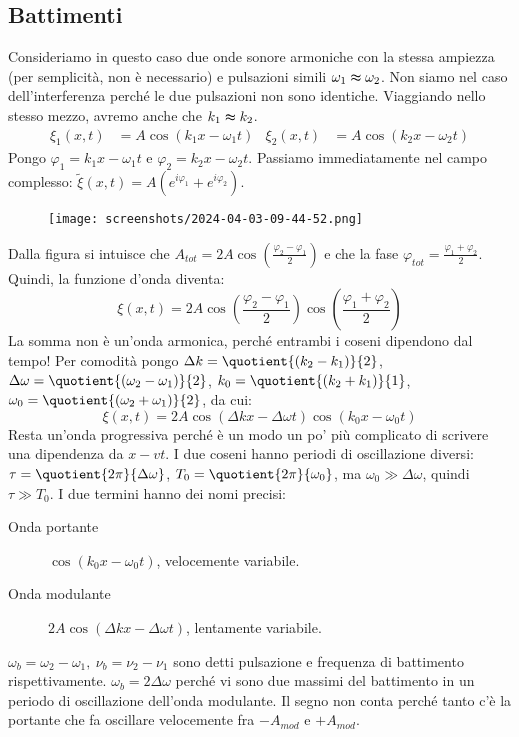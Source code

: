 \subsection{Battimenti}
Consideriamo in questo caso due onde sonore armoniche con la stessa ampiezza (per semplicità, non è necessario) e pulsazioni simili \(\omega _1 \thickapprox  \omega _2\). Non siamo nel caso dell'interferenza perché le due pulsazioni non sono identiche. Viaggiando nello stesso mezzo, avremo anche che \(k_1 \thickapprox  k_2\).
\begin{align}
	\xi _1 (x,t) &= A \cos (k_1x - \omega _1 t) & \xi _2 (x,t) &= A \cos (k_2x - \omega _2 t)
\end{align}
Pongo \(\varphi _1 = k_1 x - \omega_1 t\) e \(\varphi _2 = k_2 x - \omega _2 t\). Passiamo immediatamente nel campo complesso: \(\widetilde{\xi } (x,t) = A (e^{i \varphi _1} + e^{i \varphi _2}) \).
\begin{figure}[H]
	\centering
	\texttt{[image: screenshots/2024-04-03-09-44-52.png]}
\end{figure}
Dalla figura si intuisce che \(A_{tot} = 2A \cos \left( \frac{\varphi _2 - \varphi _1}{2} \right) \) e che la fase \(\varphi _{tot} = \frac{\varphi _1 + \varphi _2}{2} \). Quindi, la funzione d'onda diventa:
\[
	\xi (x,t) = 2A \cos \left( \frac{\varphi _2 - \varphi _1}{2} \right) \cos \left( \frac{\varphi _1 + \varphi _2}{2} \right) 
\]
La somma non è un'onda armonica, perché entrambi i coseni dipendono dal tempo! Per comodità pongo \(\Delta k = \quotient{(k_2 - k_1)}{2} \), \(\Delta \omega = \quotient{(\omega _2 - \omega _1)}{2} \), \(k_0 = \quotient{(k_2 + k_1)}{1} \), \(\omega _0 = \quotient{(\omega _2 + \omega _1 )}{2} \), da cui:
\[
	\xi (x,t) = 2A \cos (\Delta k x - \Delta \omega t) \cos (k_0 x - \omega _0 t)
\]
Resta un'onda progressiva perché è un modo un po' più complicato di scrivere una dipendenza da \(x-vt\). I due coseni hanno periodi di oscillazione diversi: \(\tau = \quotient{2\pi}{\Delta \omega } \), \(T_0 = \quotient{2 \pi }{\omega _0} \), ma \(\omega _0 \gg \Delta \omega \), quindi \(\tau \gg T_0\).
I due termini hanno dei nomi precisi:
\begin{description}
	\item[Onda portante] \(\cos (k_0 x - \omega _0 t)\), velocemente variabile.
	\item[Onda modulante] \(2A \cos (\Delta k x - \Delta \omega t)\), lentamente variabile.
\end{description}
\(\omega _b = \omega _2 - \omega _1,\ \nu _b = \nu _2 - \nu _1\) sono detti pulsazione e frequenza di battimento rispettivamente. \(\omega _b = 2 \Delta \omega \) perché vi sono due massimi del battimento in un periodo di oscillazione dell'onda modulante. Il segno non conta perché tanto c'è la portante che fa oscillare velocemente fra \(-A_{mod} \) e \(+A_{mod} \).
